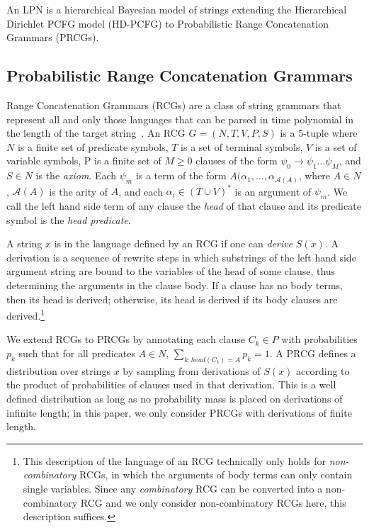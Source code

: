 \documentclass{article} %
\begin{document}
An LPN is a hierarchical Bayesian model of strings
extending the Hierarchical Dirichlet PCFG model (HD-PCFG) to
Probabilistic Range Concatenation Grammars (PRCGs).

\subsection{Probabilistic Range Concatenation Grammars}
Range Concatenation Grammars (RCGs) are a class of string grammars
that represent all and only those languages that can be parsed in time
polynomial in the length of the target
string~\cite{boullier2005range}. An RCG $G=(N, T, V, P, S)$ is a
5-tuple where $N$ is a finite set of predicate symbols, $T$ is a set
of terminal symbols, $V$ is a set of variable symbols, P is a finite
set of $M \geq 0$ clauses of the form $\psi_0 \rightarrow \psi_1 \dots
\psi_M$, and $S \in N$ is the \emph{axiom}. Each $\psi_m$ is a term of
the form $A(\alpha_1, \dots, \alpha_{\mathcal{A}(A)}$, where $A \in
N$, $\mathcal{A}(A)$ is the arity of $A$, and each $\alpha_i \in (T
\cup V)^*$ is an argument of $\psi_m$. We call the left hand side term
of any clause the \emph{head} of that clause and its predicate symbol
is the \emph{head predicate}.

A string $x$ is in the language defined by an RCG if one can
\emph{derive} $S(x)$. A derivation is a sequence of rewrite steps in
which substrings of the left hand side argument string are bound to
the variables of the head of some clause, thus determining the
arguments in the clause body. If a clause has no body terms, then its
head is derived; otherwise, its head is derived if its body clauses
are derived.\footnote{This description of the language of an RCG
  technically only holds for \emph{non-combinatory} RCGs, in which the
  arguments of body terms can only contain single variables. Since any
  \emph{combinatory} RCG can be converted into a non-combinatory RCG
  and we only consider non-combinatory RCGs here, this description
  suffices.}

We extend RCGs to PRCGs by annotating each clause $C_k \in P$ with
probabilities $p_k$ such that for all predicates ${A \in N, \,
  \sum_{k:head(C_k)=A} p_k = 1}$. A PRCG defines a distribution over
strings $x$ by sampling from derivations of $S(x)$ according to the
product of probabilities of clauses used in that derivation. This is a
well defined distribution as long as no probability mass is placed on
derivations of infinite length; in this paper, we only consider PRCGs
with derivations of finite length.
\end{document}
